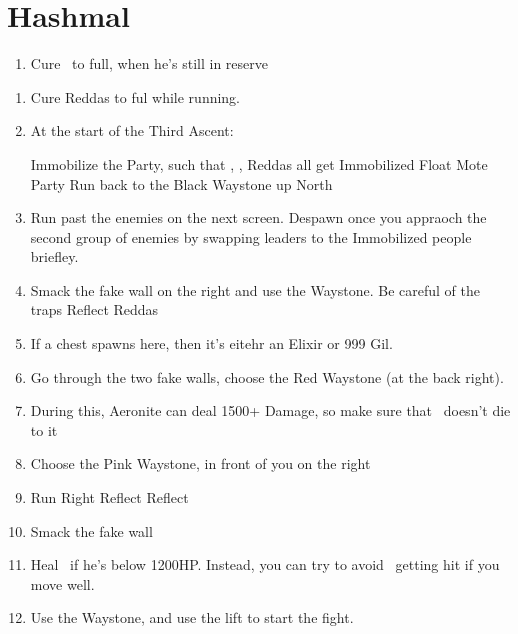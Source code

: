 \chapter{Hashmal}
\begin{enumerate}
	\item Cure \vaan\ to full, when he's still in reserve
\end{enumerate}
\begin{menu}
	\party{\vaan, \ashe, \penelo}
\end{menu}
\begin{enumerate}[resume]
	\item Cure Reddas to ful while running.
	\item At the start of the Third Ascent:
	      \begin{enumerate}
		      \penelof Immobilize the Party, such that \ashe, \penelo, Reddas all get Immobilized
		      \ashef Float Mote Party
		      \vaanf Run back to the Black Waystone up North
	      \end{enumerate}
	\item Run past the enemies on the next screen. Despawn once you appraoch the second group of enemies by swapping leaders to the Immobilized people briefley.
	\item Smack the fake wall on the right and use the Waystone. Be careful of the traps
	      \penelof Reflect Reddas
	\item If a chest spawns here, then it's eitehr an Elixir or 999 Gil.
	\item Go through the two fake walls, choose the Red Waystone (at the back right).
	\item During this, Aeronite can deal 1500+ Damage, so make sure that \vaan\ doesn't die to it
	\item Choose the Pink Waystone, in front of you on the right
	\item Run Right
	      \ashef Reflect \ashe
	      \penelof Reflect \penelo
	\item Smack the fake wall
	      \girlsout
	\item Heal \vaan\ if he's below 1200HP. Instead, you can try to avoid \vaan\ getting hit if you move well.
	\item Use the Waystone, and use the lift to start the fight.
\end{enumerate}
